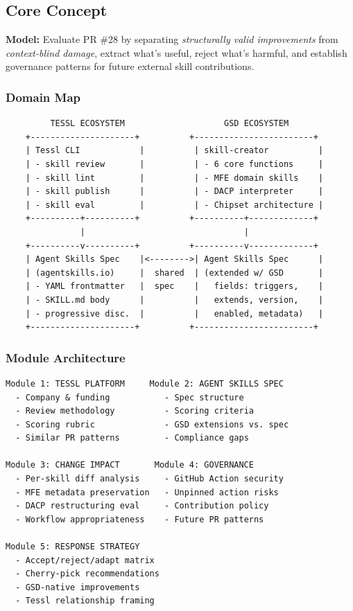 \documentclass[11pt,letterpaper]{article}
\begin{document}
\subsection{Core Concept}

\begin{quotebox}
\textbf{Model:} Evaluate PR \#28 by separating \emph{structurally valid improvements} from \emph{context-blind damage}, extract what's useful, reject what's harmful, and establish governance patterns for future external skill contributions.
\end{quotebox}

\subsubsection{Domain Map}

\begin{asciibox}
\begin{verbatim}
         TESSL ECOSYSTEM                    GSD ECOSYSTEM
    +---------------------+          +------------------------+
    | Tessl CLI            |          | skill-creator          |
    | - skill review       |          | - 6 core functions     |
    | - skill lint         |          | - MFE domain skills    |
    | - skill publish      |          | - DACP interpreter     |
    | - skill eval         |          | - Chipset architecture |
    +----------+----------+          +----------+-------------+
               |                                |
    +----------v----------+          +----------v-------------+
    | Agent Skills Spec    |<-------->| Agent Skills Spec      |
    | (agentskills.io)     |  shared  | (extended w/ GSD       |
    | - YAML frontmatter   |  spec    |   fields: triggers,    |
    | - SKILL.md body      |          |   extends, version,    |
    | - progressive disc.  |          |   enabled, metadata)   |
    +---------------------+          +------------------------+
\end{verbatim}
\end{asciibox}

\subsubsection{Module Architecture}

\begin{asciibox}
\begin{verbatim}
Module 1: TESSL PLATFORM     Module 2: AGENT SKILLS SPEC
  - Company & funding           - Spec structure
  - Review methodology          - Scoring criteria
  - Scoring rubric              - GSD extensions vs. spec
  - Similar PR patterns         - Compliance gaps

Module 3: CHANGE IMPACT       Module 4: GOVERNANCE
  - Per-skill diff analysis     - GitHub Action security
  - MFE metadata preservation   - Unpinned action risks
  - DACP restructuring eval     - Contribution policy
  - Workflow appropriateness    - Future PR patterns

Module 5: RESPONSE STRATEGY
  - Accept/reject/adapt matrix
  - Cherry-pick recommendations
  - GSD-native improvements
  - Tessl relationship framing
\end{verbatim}
\end{asciibox}
\end{document}
